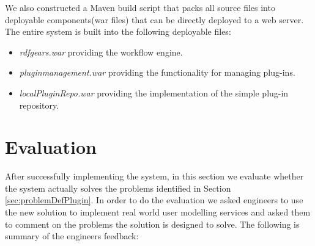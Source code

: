 We also constructed a Maven build script that packs all source files into deployable components(war files) that can be directly deployed to a web server. The entire system is built into the following deployable files:
\begin{itemize}
	\item \textit{rdfgears.war} providing the workflow engine.
	\item \textit{pluginmanagement.war} providing the functionality for managing plug-ins.
	\item \textit{localPluginRepo.war} providing the implementation of the simple plug-in repository.
\end{itemize}


\section{Evaluation}
\label{sec:evalPlugin}

After successfully implementing the system, in this section we evaluate whether the system actually solves the problems identified in Section \ref{sec:problemDefPlugin}. In order to do the evaluation we asked engineers to use the new solution to implement real world user modelling services and asked them to comment on the problems the solution is designed to solve. The following is summary of the engineers feedback:

